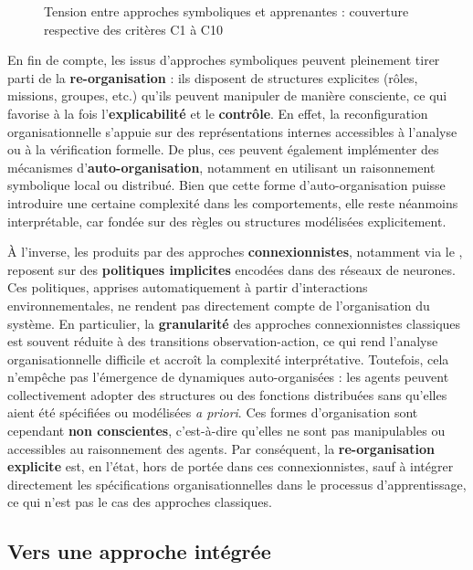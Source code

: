 \begin{figure}[H]
    \centering
    \resizebox{\textwidth}{!}{%
        
    }
    \caption{Tension entre approches symboliques et apprenantes : couverture respective des critères C1 à C10}
    \label{fig:tension-symbolic-learning}
\end{figure}

En fin de compte, les  issus d'approches symboliques peuvent pleinement tirer parti de la \textbf{re-organisation} : ils disposent de structures explicites (rôles, missions, groupes, etc.) qu'ils peuvent manipuler de manière consciente, ce qui favorise à la fois l'\textbf{explicabilité} et le \textbf{contrôle}. En effet, la reconfiguration organisationnelle s'appuie sur des représentations internes accessibles à l'analyse ou à la vérification formelle. De plus, ces  peuvent également implémenter des mécanismes d'\textbf{auto-organisation}, notamment en utilisant un raisonnement symbolique local ou distribué. Bien que cette forme d'auto-organisation puisse introduire une certaine complexité dans les comportements, elle reste néanmoins interprétable, car fondée sur des règles ou structures modélisées explicitement.

À l'inverse, les  produits par des approches \textbf{connexionnistes}, notamment via le , reposent sur des \textbf{politiques implicites} encodées dans des réseaux de neurones. Ces politiques, apprises automatiquement à partir d'interactions environnementales, ne rendent pas directement compte de l'organisation du système. En particulier, la \textbf{granularité} des approches connexionnistes classiques est souvent réduite à des transitions observation-action, ce qui rend l'analyse organisationnelle difficile et accroît la complexité interprétative. Toutefois, cela n'empêche pas l'émergence de dynamiques auto-organisées : les agents peuvent collectivement adopter des structures ou des fonctions distribuées sans qu'elles aient été spécifiées ou modélisées \textit{a priori}. Ces formes d'organisation sont cependant \textbf{non conscientes}, c'est-à-dire qu'elles ne sont pas manipulables ou accessibles au raisonnement des agents. Par conséquent, la \textbf{re-organisation explicite} est, en l'état, hors de portée dans ces  connexionnistes, sauf à intégrer directement les spécifications organisationnelles dans le processus d'apprentissage, ce qui n'est pas le cas des approches  classiques.

\subsection*{Vers une approche intégrée}

